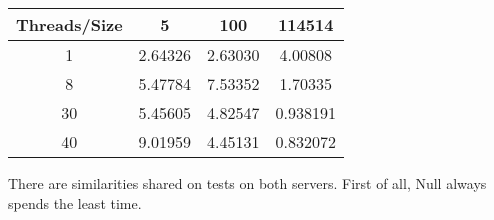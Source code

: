 \begin{enumerate}
\begin{enumerate}
\begin{center}
      \begin{tabular}{|c|c|c|c|}
      \hline
        Threads/Size & 5 & 100 & 114514 \\
      \hline 1 & 2.64326 & 2.63030 & 4.00808 \\
      \hline 8 & 5.47784 & 7.53352 & 1.70335 \\
      \hline 30 & 5.45605 & 4.82547 & 0.938191 \\
      \hline 40 & 9.01959 & 4.45131 & 0.832072 \\
      \hline
      \end{tabular}
    \end{center}
  \end{enumerate}
\end{enumerate}

There are similarities shared on tests on both servers.
First of all, Null always spends the least time.





